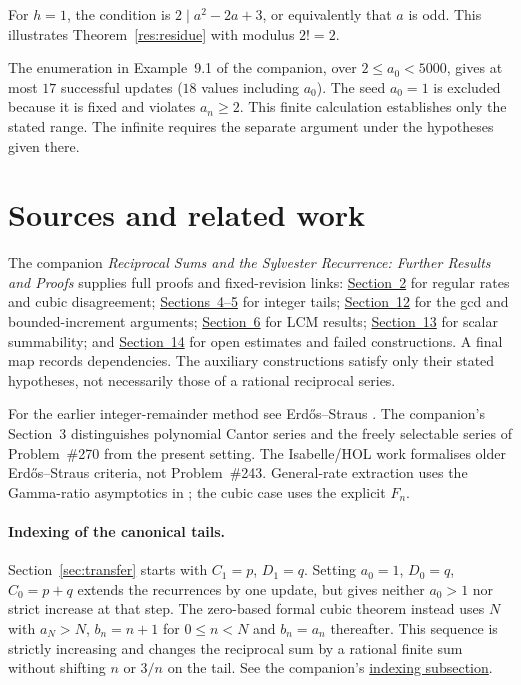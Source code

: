 \documentclass[11pt]{article}
\begin{document}
For $h=1$, the condition is $2\mid a^2-2a+3$, or equivalently that $a$ is odd.
This illustrates Theorem~\ref{res:residue} with modulus $2!=2$.

The enumeration in Example~9.1 of the companion, over
$2\le a_0<5000$, gives at most $17$ successful updates ($18$ values
including $a_0$). The seed $a_0=1$ is excluded because it is fixed
and violates $a_n\ge2$. This finite calculation establishes only the
stated range. The infinite
requires the separate argument under the hypotheses given there.


\section{Sources and related work}\label{app:index}
The companion \emph{Reciprocal Sums and the Sylvester Recurrence:
Further Results and Proofs} supplies full proofs and fixed-revision links:
\href{erdos243-reciprocal-tail-reasoning-surface.pdf\#243-long-cubic}{Section~2}
for regular rates and cubic disagreement;
\href{erdos243-reciprocal-tail-reasoning-surface.pdf\#243-long-integer-tails}{Sections~4--5}
for integer tails;
\href{erdos243-reciprocal-tail-reasoning-surface.pdf\#243-long-bounded-increases}{Section~12}
for the gcd and bounded-increment arguments;
\href{erdos243-reciprocal-tail-reasoning-surface.pdf\#243-long-weighted-records}{Section~6}
for LCM results;
\href{erdos243-reciprocal-tail-reasoning-surface.pdf\#243-long-relative-increase}{Section~13}
for scalar summability; and
\href{erdos243-reciprocal-tail-reasoning-surface.pdf\#243-long-open-questions}{Section~14}
for open estimates and failed constructions. A final map records dependencies.
The auxiliary constructions satisfy only their stated hypotheses, not
necessarily those of a rational reciprocal series.

For the earlier integer-remainder method see
Erd\H{o}s--Straus \cite[Theorem~2.1, pp.~85--86]{erdosstraus1974}.
The companion's Section~3 distinguishes polynomial Cantor series
\cite[Theorem~2.2, pp.~39--40]{hancltijdeman2008} and the freely
selectable series of Problem~\#270 \cite[Theorems~1--2]{crmarickovac2025}
from the present setting. The Isabelle/HOL work \cite{kouli2020}
formalises older Erd\H{o}s--Straus criteria, not Problem~\#243.
General-rate extraction uses the Gamma-ratio asymptotics
in \cite{dlmf_gamma}; the cubic case uses the explicit $F_n$.

\paragraph{Indexing of the canonical tails.}
Section~\ref{sec:transfer} starts with $C_1=p$, $D_1=q$.
Setting $a_0=1$, $D_0=q$, $C_0=p+q$ extends the recurrences by one
update, but gives neither $a_0>1$ nor strict increase at that step.
The zero-based formal cubic theorem instead uses $N$ with $a_N>N$,
$b_n=n+1$ for $0\le n<N$ and $b_n=a_n$ thereafter. This sequence
is strictly increasing and changes the reciprocal sum by a rational
finite sum without shifting $n$ or $3/n$ on the tail. See the companion's
\href{erdos243-reciprocal-tail-reasoning-surface.pdf\#243-long-indexing}{indexing subsection}.
\end{document}
